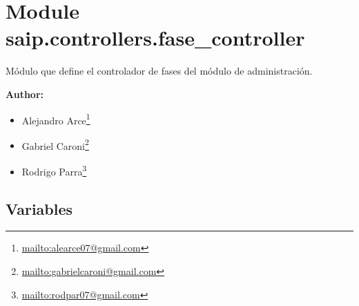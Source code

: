 %
%
%


\section{Module saip.controllers.fase\_controller}

    \label{saip:controllers:fase_controller}
Módulo que define el controlador de fases del módulo de administración.

\textbf{Author:} \begin{itemize}
\setlength{\parskip}{0.6ex}
  \item Alejandro 
    Arce\footnote{\href{mailto:alearce07@gmail.com}{mailto:alearce07@gmail.com}}

  \item Gabriel 
    Caroni\footnote{\href{mailto:gabrielcaroni@gmail.com}{mailto:gabrielcaroni@gmail.com}}

  \item Rodrigo 
    Parra\footnote{\href{mailto:rodpar07@gmail.com}{mailto:rodpar07@gmail.com}}

\end{itemize}





  \subsection{Variables}

